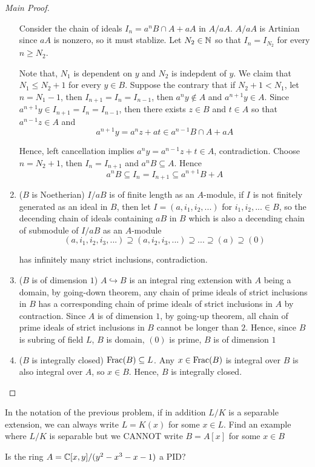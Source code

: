 \begin{proof}[Main Proof]
\begin{enumerate}
		Consider the chain of ideals $I_n = a^n B \cap A + aA$ in $A / aA$. $A / aA$ is Artinian since $aA$ is nonzero, so it must stablize. Let $N_2 \in \mathbb{N}$ so that $I_n = I_{N_2}$ for every $n \geq N_2$. 
		
		Note that, $N_1$ is dependent on $y$ and $N_2$ is indepdent of $y$. We claim that $N_1 \leq N_2 + 1$ for every $y \in B$. Suppose the contrary that if $N_2 + 1 < N_1$, let $n = N_1 - 1$, then $I_{n+1} = I_n = I_{n-1}$, then $a^n y \notin A$ and $a^{n+1} y \in A$. Since $a^{n+1} y \in I_{n+1} = I_n = I_{n-1}$, then there exists $z \in B$ and $t \in A$ so that $a^{n-1} z \in A$ and
		$$
			a^{n+1} y = a^n z + at \in a^{n-1} B \cap A + aA
		$$
		
		Hence, left cancellation implies $a^n y = a^{n-1} z + t \in A$, contradiction. Choose $n = N_2 + 1$, then $I_n = I_{n+1}$ and $a^n B \subseteq A$. Hence
		$$
			a^n B \subseteq I_n = I_{n+1} \subseteq a^{n+1} B + A 
		$$
		
		\item ($B$ is Noetherian)
		$I / aB$ is of finite length as an $A$-module, if $I$ is not finitely generated as an ideal in $B$, then let $I = (a, i_1, i_2, ...)$ for $i_1, i_2, ... \in B$, so the decending chain of ideals containing $aB$ in $B$ which is also a decending chain of submodule of $I / aB$ as an $A$-module
		$$
		(a, i_1, i_2, i_3, ...) \supseteq (a, i_2, i_3, ...) \supseteq ... \supseteq (a) \supseteq (0)
		$$
		
		has infinitely many strict inclusions, contradiction.
		
		\item ($B$ is of dimension $1$) $A \hookrightarrow B$ is an integral ring extension with $A$ being a domain, by going-down theorem, any chain of prime ideals of strict inclusions  in $B$ has a corresponding chain of prime ideals of strict inclusions in $A$ by contraction. Since $A$ is of dimension $1$, by going-up theorem, all chain of prime ideals of strict inclusions in $B$ cannot be longer than $2$. Hence, since $B$ is subring of field $L$, $B$ is domain, $(0)$ is prime, $B$ is of dimension $1$
		
		\item ($B$ is integrally closed) $\operatorname{Frac}(B) \subseteq L$. Any $x \in \operatorname{Frac}(B)$ is integral over $B$ is also integral over $A$, so $x \in B$. Hence, $B$ is integrally closed.
	\end{enumerate}
\end{proof}

\begin{problem}[optional]
	In the notation of the previous problem, if in addition $L / K$ is a separable extension, we can always write $L = K(x)$ for some $x \in L$. Find an example where $L / K$ is separable but we CANNOT write $B = A[x]$ for some $x \in B$
\end{problem}

\begin{problem}[optional]
	Is the ring $A = \mathbb{C}[x, y] / (y^2 - x^3 - x - 1)$ a PID?
\end{problem}